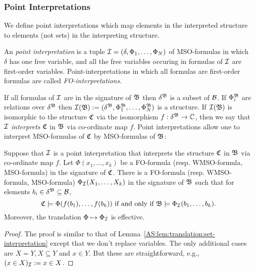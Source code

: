 \subsubsection{Point Interpretations}

We define point interpretations which map elements in the interpreted structure to elements (not sets) in the interpreting structure.

\begin{definition}
An \emph{point interpretation} is a tuple ${\mathcal I} = (\delta, \Phi_1, \dots, 
\Phi_N)$ of MSO-formulas in which $\delta$ has one free variable, and all the free variables occuring in formulas of ${\mathcal I}$ are first-order variables.
Point-interpretations in which all formulas are first-order formulas are called \emph{FO-interpretations}.
\end{definition}

If all formulas of ${\mathcal I}$ are in the signature of $\mathfrak{B}$ then $\delta^{\mathfrak{B}}$ is a subset of ${\mathcal B}$.
If $\Phi_i^{\mathfrak{B}}$ are relations over $\delta^{\mathfrak{B}}$ then ${\mathcal I}(\mathfrak{B}) := (\delta^{\mathfrak{B}}, \Phi_1^{\mathfrak{B}}, \dots, \Phi_N^{\mathfrak{B}})$ is a structure. 
If ${\mathcal I}(\mathfrak{B})$ is isomorphic to the structure $\mathfrak{C}$ via the isomorphism $f:\delta^{\mathfrak{B}} \to \mathbb{C}$, then we say that ${\mathcal I}$ \emph{interprets} $\mathfrak{C}$ in $\mathfrak{B}$ via co-ordinate map $f$. Point interpretations allow one to interpret MSO-formulas of $\mathfrak{C}$ by MSO-formulas of $\mathfrak{B}$:


\begin{lemma} \label{AS:lem:translation:point-interpretation} 
Suppose that ${\mathcal I}$ is a point interpretation that interprets the structure $\mathfrak{C}$ in $\mathfrak{B}$ via co-ordinate map $f$.
Let $\Phi(x_1,\dots,x_k)$ be a FO-formula (resp. WMSO-formula, MSO-formula) in the signature of $\mathfrak{C}$. 
There is a FO-formula (resp. WMSO-formula, MSO-formula) $\Phi_{\mathcal I}(X_1,\dots,X_k)$ in the signature of $\mathfrak{B}$ such that for elements
$b_i \in \delta^{\mathfrak{B}} \subseteq {\mathcal B}$,
\[
\mathfrak{C} \models \Phi(f(b_1),\dots,f(b_k)) \mbox{ if and only if } \mathfrak{B} \models \Phi_{\mathcal I}(b_1,\dots,b_k).
\]
Moreover, the translation $\Phi \mapsto \Phi_{\mathcal I}$ is effective.
\end{lemma}

\begin{proof}
The proof is similar to that of Lemma~\ref{AS:lem:translation:set-interpretation} except that we don't replace variables. The only additional cases are $X = Y, X \subseteq Y$ and $x \in Y$. But these are straightforward, e.g., $(x \in X)_{\mathcal I} := x \in X$.
\end{proof}



